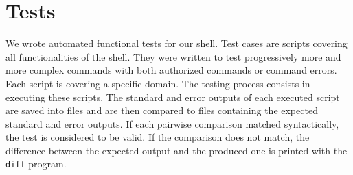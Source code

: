 \documentclass[fleqn]{article}
\begin{document}
\section{Tests}

We wrote automated functional tests for our shell.
Test cases are scripts covering all functionalities of the shell. They were written to test progressively more and more complex commands with both authorized commands or command errors. Each script is covering a specific domain.
The testing process consists in executing these scripts.
The standard and error outputs of each executed script are saved into files and are then compared to files containing the expected standard and error outputs.
If each pairwise comparison matched syntactically, the test is considered to be valid.
If the comparison does not match, the difference between the expected output and the produced one is printed with the \texttt{diff} program.
\end{document}
